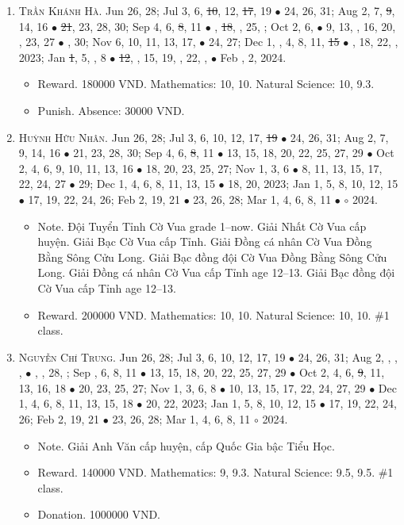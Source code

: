 \documentclass{article}
\begin{document}
\begin{enumerate}
	\item \textsc{Trần Khánh Hà.} {\sf[In]} Jun 26, 28; Jul 3, 6, \st{10}, 12, \st{17}, 19 $\bullet$ 24, 26, 31; Aug 2, 7, \st{9}, 14, 16 $\bullet$ \st{21}, 23, 28, 30; Sep 4, 6, \st{8}, 11 $\bullet$ , \st{18}, , 25, ; Oct 2, 6,   $\bullet$ 9, 13, , 16, 20, , 23, 27 $\bullet$ , 30; Nov 6, 10, 11, 13, 17,  $\bullet$ 24, 27; Dec 1, , 4, 8, 11, \st{15} $\bullet$ , 18, 22, , 2023; Jan \st{1}, 5, , 8  $\bullet$ \st{12}, , 15, 19, , 22, ,  $\bullet$ Feb , 2, 2024.
	\begin{itemize}
		\item {\sf Reward.} 180000 VND. Mathematics: 10, 10. Natural Science: 10, 9.3.
		\item {\sf Punish.} Absence: 30000 VND.
	\end{itemize}
	\item \textsc{Huỳnh Hữu Nhân.} {\sf[In]} Jun 26, 28; Jul 3, 6, 10, 12, 17, \st{19} $\bullet$ 24, 26, 31; Aug 2, 7, 9, 14, 16 $\bullet$ 21, 23, 28, 30; Sep 4, 6, \st{8}, 11 $\bullet$ 13, 15, 18, 20, 22, 25, 27, 29 $\bullet$ Oct 2, 4, 6, 9, 10, 11, 13, 16 $\bullet$ 18, 20, 23, 25, 27; Nov 1, 3, 6 $\bullet$ 8, 11, 13, 15, 17, 22, 24, 27 $\bullet$ 29; Dec 1, 4, 6, 8, 11, 13, 15 $\bullet$ 18, 20, 2023; Jan 1, 5, 8, 10, 12, 15 $\bullet$ 17, 19, 22, 24, 26; Feb 2, 19, 21 $\bullet$ 23, 26, 28; Mar 1, 4, 6, 8, 11 $\bullet$ $\circ$ 2024.
	\begin{itemize}
		\item {\sf Note.} Đội Tuyển Tỉnh Cờ Vua grade 1--now. Giải Nhất Cờ Vua cấp huyện. Giải Bạc Cờ Vua cấp Tỉnh. Giải Đồng cá nhân Cờ Vua Đồng Bằng Sông Cửu Long. Giải Bạc đồng đội Cờ Vua Đồng Bằng Sông Cửu Long. Giải Đồng cá nhân Cờ Vua cấp Tỉnh age 12--13. Giải Bạc đồng đội Cờ Vua cấp Tỉnh age 12--13.
		\item {\sf Reward.} 200000 VND. Mathematics: 10, 10. Natural Science: 10, 10. \#1 class.
	\end{itemize}
	\item \textsc{Nguyễn Chí Trung.} {\sf[In]} Jun 26, 28; Jul 3, 6, 10, 12, 17, 19 $\bullet$ 24, 26, 31; Aug 2, , , ,  $\bullet$ , , 28, ; Sep , 6, 8, 11 $\bullet$ 13, 15, 18, 20, 22, 25, 27, 29 $\bullet$ Oct 2, 4, 6, \st{9}, 11, 13, 16, 18 $\bullet$ 20, 23, 25, 27; Nov 1, 3, 6, 8 $\bullet$ 10, 13, 15, 17, 22, 24, 27, 29 $\bullet$ Dec 1, 4, 6, 8, 11, 13, 15, 18 $\bullet$ 20, 22, 2023; Jan 1, 5, 8, 10, 12, 15 $\bullet$ 17, 19, 22, 24, 26; Feb 2, 19, 21 $\bullet$ 23, 26, 28; Mar 1, 4, 6, 8, 11 $\circ$ 2024.
	\begin{itemize}
		\item {\sf Note.} Giải Anh Văn cấp huyện, cấp Quốc Gia bậc Tiểu Học.
		\item {\sf Reward.} 140000 VND. Mathematics: 9, 9.3. Natural Science: 9.5, 9.5. \#1 class.
		\item {\sf Donation.} 1000000 VND.
	\end{itemize}
\end{enumerate}
\end{document}
